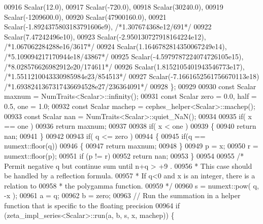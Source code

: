 \begin{DoxyCode}
00916             Scalar(12.0),
00917             Scalar(-720.0),
00918             Scalar(30240.0),
00919             Scalar(-1209600.0),
00920             Scalar(47900160.0),
00921             Scalar(-1.8924375803183791606e9), \textcolor{comment}{/*1.307674368e12/691*/}
00922             Scalar(7.47242496e10),
00923             Scalar(-2.950130727918164224e12), \textcolor{comment}{/*1.067062284288e16/3617*/}
00924             Scalar(1.1646782814350067249e14), \textcolor{comment}{/*5.109094217170944e18/43867*/}
00925             Scalar(-4.5979787224074726105e15), \textcolor{comment}{/*8.028576626982912e20/174611*/}
00926             Scalar(1.8152105401943546773e17), \textcolor{comment}{/*1.5511210043330985984e23/854513*/}
00927             Scalar(-7.1661652561756670113e18) \textcolor{comment}{/*1.6938241367317436694528e27/236364091*/}
00928             \};
00929 
00930         \textcolor{keyword}{const} Scalar maxnum = NumTraits<Scalar>::infinity();
00931         \textcolor{keyword}{const} Scalar zero = 0.0, half = 0.5, one = 1.0;
00932         \textcolor{keyword}{const} Scalar machep = cephes\_helper<Scalar>::machep();
00933         \textcolor{keyword}{const} Scalar nan = NumTraits<Scalar>::quiet\_NaN();
00934 
00935         \textcolor{keywordflow}{if}( x == one )
00936             \textcolor{keywordflow}{return} maxnum;
00937 
00938         \textcolor{keywordflow}{if}( x < one )
00939         \{
00940             \textcolor{keywordflow}{return} nan;
00941         \}
00942 
00943         \textcolor{keywordflow}{if}( q <= zero )
00944         \{
00945             \textcolor{keywordflow}{if}(q == numext::floor(q))
00946             \{
00947                 \textcolor{keywordflow}{return} maxnum;
00948             \}
00949             p = x;
00950             r = numext::floor(p);
00951             \textcolor{keywordflow}{if} (p != r)
00952                 \textcolor{keywordflow}{return} nan;
00953         \}
00954 
00955         \textcolor{comment}{/* Permit negative q but continue sum until n+q > +9 .}
00956 \textcolor{comment}{         * This case should be handled by a reflection formula.}
00957 \textcolor{comment}{         * If q<0 and x is an integer, there is a relation to}
00958 \textcolor{comment}{         * the polygamma function.}
00959 \textcolor{comment}{         */}
00960         s = numext::pow( q, -x );
00961         a = q;
00962         b = zero;
00963         \textcolor{comment}{// Run the summation in a helper function that is specific to the floating precision}
00964         \textcolor{keywordflow}{if} (zeta\_impl\_series<Scalar>::run(a, b, s, x, machep)) \{

\end{DoxyCode}
